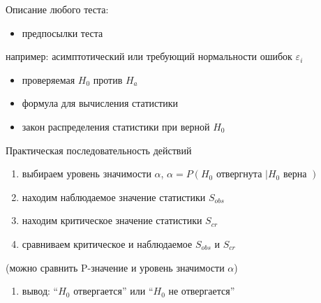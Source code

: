 \documentclass[russian,ignorenonframetext,]{beamer}
\providecommand{\tightlist}{%
  \setlength{\itemsep}{0pt}\setlength{\parskip}{0pt}}
\newcommand{\e}{\varepsilon}
\begin{document}
\begin{frame}{Описание любого теста:}

\begin{itemize}
\tightlist
\item
  предпосылки теста
\end{itemize}

например: асимптотический или требующий нормальности ошибок \(\e_i\)

\begin{itemize}
\tightlist
\item
  проверяемая \(H_0\) против \(H_a\)
\item
  формула для вычисления статистики
\item
  закон распределения статистики при верной \(H_0\)
\end{itemize}

\end{frame}

\begin{frame}{Практическая последовательность действий}

\begin{enumerate}
\def\labelenumi{\arabic{enumi}.}
\tightlist
\item
  выбираем уровень значимости \(\alpha\),
  \(\alpha=P(H_0 \text{ отвергнута }| H_0 \text{ верна })\)
\item
  находим наблюдаемое значение статистики \(S_{obs}\)
\item
  находим критическое значение статистики \(S_{cr}\)
\item
  сравниваем критическое и наблюдаемое \(S_{obs}\) и \(S_{cr}\)
\end{enumerate}

(можно сравнить P-значение и уровень значимости \(\alpha\))

\begin{enumerate}
\def\labelenumi{\arabic{enumi}.}
\setcounter{enumi}{4}
\tightlist
\item
  вывод: ``\(H_0\) отвергается'' или ``\(H_0\) не отвергается''
\end{enumerate}

\end{frame}
\end{document}
